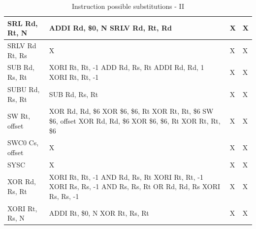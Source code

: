 \documentclass[a4paper,twoside]{article}
\theoremstyle{definition}
\theoremstyle{remark}
\begin{document}
\begin{table}[H]
\begin{tabular}{|p{}|p{}|p{}|p{}|}
SRL Rd, Rt, N&ADDI Rd, \$0, N\newline
              SRLV Rd, Rt, Rd &	X & X  \\  \hline
SRLV Rd Rt, Rs& X&	X & X  \\  \hline
SUB Rd, Rs, Rt& XORI Rt, Rt, -1\newline
                ADD Rd, Rs, Rt \newline
                ADDI Rd, Rd, 1 \newline
                XORI Rt, Rt, -1&	X & X \\  \hline
SUBU Rd, Rs, Rt&SUB Rd, Rs, Rt&	X & X  \\  \hline
SW Rt, offset&XOR Rd, Rd, \$6 \newline
              XOR \$6, \$6, Rt \newline
              XOR Rt, Rt, \$6 \newline
              SW \$6, offset \newline
              XOR Rd, Rd, \$6 \newline
              XOR \$6, \$6, Rt \newline
              XOR Rt, Rt, \$6 
               & X & X  \\  \hline
SWC0 Cs, offset&X &	X & X  \\  \hline
SYSC &X &	X & X  \\  \hline
XOR Rd, Rs, Rt&XORI Rt, Rt, -1 \newline
               AND Rd, Rs, Rt \newline
               XORI Rt, Rt, -1 \newline
               XORI Rs, Rs, -1 \newline
               AND Rs, Rs, Rt \newline
               OR Rd, Rd, Rs \newline
               XORI Rs, Rs, -1 &	X & X  \\  \hline
XORI Rt, Rs, N&ADDI Rt, \$0, N \newline
               XOR Rt, Rs, Rt &	X &X \\  \hline
\end{tabular}
\caption{Instruction possible substitutions - II}
\end{table}
\end{document}
